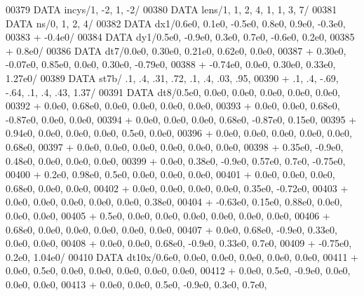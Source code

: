 \begin{DoxyCode}
00379       \textcolor{keyword}{DATA}              incys/1, -2, 1, -2/
00380       \textcolor{keyword}{DATA}              lens/1, 1, 2, 4, 1, 1, 3, 7/
00381       \textcolor{keyword}{DATA}              ns/0, 1, 2, 4/
00382       \textcolor{keyword}{DATA}              dx1/0.6e0, 0.1e0, -0.5e0, 0.8e0, 0.9e0, -0.3e0,
00383      +                  -0.4e0/
00384       \textcolor{keyword}{DATA}              dy1/0.5e0, -0.9e0, 0.3e0, 0.7e0, -0.6e0, 0.2e0,
00385      +                  0.8e0/
00386       \textcolor{keyword}{DATA}              dt7/0.0e0, 0.30e0, 0.21e0, 0.62e0, 0.0e0,
00387      +                  0.30e0, -0.07e0, 0.85e0, 0.0e0, 0.30e0, -0.79e0,
00388      +                  -0.74e0, 0.0e0, 0.30e0, 0.33e0, 1.27e0/
00389       \textcolor{keyword}{DATA}              st7b/ .1, .4, .31, .72,     .1, .4, .03, .95,
00390      +                  .1, .4, -.69, -.64,   .1, .4, .43, 1.37/
00391       \textcolor{keyword}{DATA}              dt8/0.5e0, 0.0e0, 0.0e0, 0.0e0, 0.0e0, 0.0e0,
00392      +                  0.0e0, 0.68e0, 0.0e0, 0.0e0, 0.0e0, 0.0e0,
00393      +                  0.0e0, 0.0e0, 0.68e0, -0.87e0, 0.0e0, 0.0e0,
00394      +                  0.0e0, 0.0e0, 0.0e0, 0.68e0, -0.87e0, 0.15e0,
00395      +                  0.94e0, 0.0e0, 0.0e0, 0.0e0, 0.5e0, 0.0e0,
00396      +                  0.0e0, 0.0e0, 0.0e0, 0.0e0, 0.0e0, 0.68e0,
00397      +                  0.0e0, 0.0e0, 0.0e0, 0.0e0, 0.0e0, 0.0e0,
00398      +                  0.35e0, -0.9e0, 0.48e0, 0.0e0, 0.0e0, 0.0e0,
00399      +                  0.0e0, 0.38e0, -0.9e0, 0.57e0, 0.7e0, -0.75e0,
00400      +                  0.2e0, 0.98e0, 0.5e0, 0.0e0, 0.0e0, 0.0e0,
00401      +                  0.0e0, 0.0e0, 0.0e0, 0.68e0, 0.0e0, 0.0e0,
00402      +                  0.0e0, 0.0e0, 0.0e0, 0.0e0, 0.35e0, -0.72e0,
00403      +                  0.0e0, 0.0e0, 0.0e0, 0.0e0, 0.0e0, 0.38e0,
00404      +                  -0.63e0, 0.15e0, 0.88e0, 0.0e0, 0.0e0, 0.0e0,
00405      +                  0.5e0, 0.0e0, 0.0e0, 0.0e0, 0.0e0, 0.0e0, 0.0e0,
00406      +                  0.68e0, 0.0e0, 0.0e0, 0.0e0, 0.0e0, 0.0e0,
00407      +                  0.0e0, 0.68e0, -0.9e0, 0.33e0, 0.0e0, 0.0e0,
00408      +                  0.0e0, 0.0e0, 0.68e0, -0.9e0, 0.33e0, 0.7e0,
00409      +                  -0.75e0, 0.2e0, 1.04e0/
00410       \textcolor{keyword}{DATA}              dt10x/0.6e0, 0.0e0, 0.0e0, 0.0e0, 0.0e0, 0.0e0,
00411      +                  0.0e0, 0.5e0, 0.0e0, 0.0e0, 0.0e0, 0.0e0, 0.0e0,
00412      +                  0.0e0, 0.5e0, -0.9e0, 0.0e0, 0.0e0, 0.0e0,
00413      +                  0.0e0, 0.0e0, 0.5e0, -0.9e0, 0.3e0, 0.7e0,

\end{DoxyCode}
